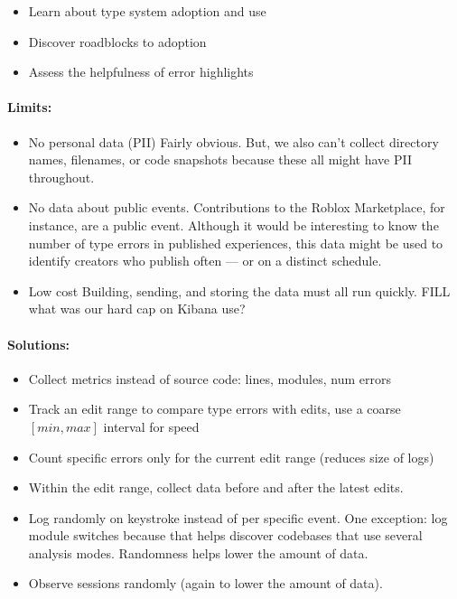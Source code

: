 \documentclass[english,submission,cleveref]{programming}
\begin{document}
\begin{itemize}
  \item
    Learn about type system adoption and use
  \item
    Discover roadblocks to adoption
  \item
    Assess the helpfulness of error highlights
\end{itemize}

\paragraph{Limits:}

\begin{itemize}
\item
  No personal data (PII)
  \subitem
    Fairly obvious.
    But, we also can't collect directory names, filenames, or code snapshots
    because these all might have PII throughout.
\item
  No data about public events.
  \subitem
    Contributions to the Roblox Marketplace, for instance, are a public event.
    Although it would be interesting to know the number of type errors
    in published experiences, this data might be used to identify creators
    who publish often --- or on a distinct schedule.
\item
  Low cost
  \subitem
    Building, sending, and storing the data must all run quickly.
    FILL what was our hard cap on Kibana use?
\end{itemize}


\paragraph{Solutions:}

\begin{itemize}
  \item
    Collect metrics instead of source code: lines, modules, num errors
  \item
    Track an edit range to compare type errors with edits,
    use a coarse $[min, max]$ interval for speed
  \item
    Count specific errors only for the current edit range
    (reduces size of logs)
  \item
    Within the edit range, collect data before and after the latest edits.
  \item
    Log randomly on keystroke instead of per specific event.
    One exception: log module switches because that helps discover
    codebases that use several analysis modes.
    Randomness helps lower the amount of data.
  \item
    Observe sessions randomly (again to lower the amount of data).
\end{itemize}
\end{document}
